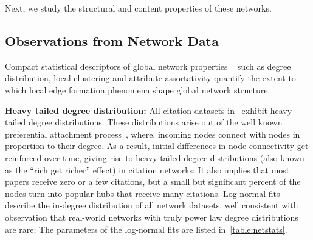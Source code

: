 Next, we study the structural and content properties of these networks. 
%


\subsection{Observations from Network Data}
\label{subsec:factors}

Compact
statistical descriptors of global network properties ~\cite{newman2010networks}
such as degree distribution, local clustering and attribute assortativity
quantify the extent to which local edge formation phenomena shape global network
structure.

\textbf{Heavy tailed degree distribution:} All citation datasets in~ exhibit heavy tailed degree distributions. These distributions arise out of the well known preferential attachment process~\cite{simon1955class,barabasi1999emergence}, where, incoming nodes connect with nodes in proportion to their degree. As a result, initial differences in node
connectivity get reinforced over time, giving rise to heavy
tailed degree distributions (also known as the ``rich get richer'' effect) in citation networks; It also implies that most papers receive zero or a few
citations, but a small but significant percent of the nodes turn into popular
hubs that receive many citations. Log-normal fits describe the in-degree
distribution of all network datasets, well consistent with~\citet{broido2018scale} observation that real-world networks with truly power law
degree distributions are rare; The parameters of the log-normal fits are
listed in~\cref{table:netstats}. 

